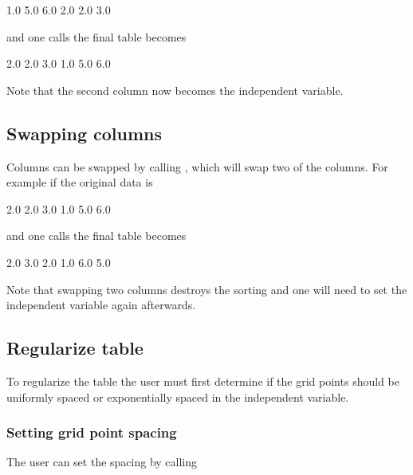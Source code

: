 \documentclass[letterpaper,10pt,english]{sphinxmanual}
\begin{document}
\begin{sphinxVerbatim}[commandchars=\\\{\},formatcom=\scriptsize]
1.0  5.0  6.0
2.0  2.0  3.0
\end{sphinxVerbatim}

and one calls  the final table becomes

\begin{sphinxVerbatim}[commandchars=\\\{\},formatcom=\scriptsize]
2.0  2.0  3.0
1.0  5.0  6.0
\end{sphinxVerbatim}

Note that the second column now becomes the independent variable.


\subsection{Swapping columns}
\label{\detokenize{Utilities/LookupTable:swapping-columns}}
Columns can be swapped by calling , which will swap two of the columns.
For example if the original data is

\begin{sphinxVerbatim}[commandchars=\\\{\},formatcom=\scriptsize]
2.0  2.0  3.0
1.0  5.0  6.0
\end{sphinxVerbatim}

and one calls  the final table becomes

\begin{sphinxVerbatim}[commandchars=\\\{\},formatcom=\scriptsize]
2.0  3.0  2.0
1.0  6.0  5.0
\end{sphinxVerbatim}

Note that swapping two columns destroys the sorting and one will need to set the independent variable again afterwards.


\subsection{Regularize table}
\label{\detokenize{Utilities/LookupTable:regularize-table}}
To regularize the table the user must first determine if the grid points should be uniformly spaced or exponentially spaced in the independent variable.


\subsubsection{Setting grid point spacing}
\label{\detokenize{Utilities/LookupTable:setting-grid-point-spacing}}
The user can set the spacing by calling
\end{document}
